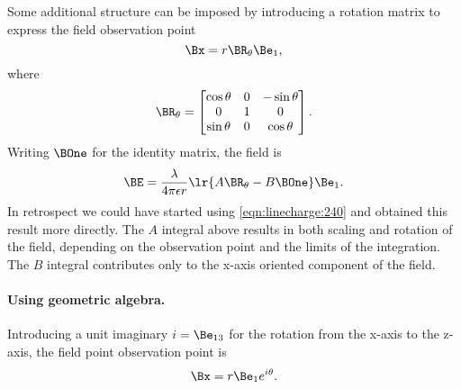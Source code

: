 Some additional structure can be imposed by introducing a rotation matrix to express the field observation point
\begin{equation}\label{eqn:linecharge:240}
\Bx = r \BR_\theta \Be_1,
\end{equation}
where
\begin{equation}\label{eqn:linecharge:260}
\BR_\theta =
\begin{bmatrix}
\cos\theta & 0 & -\sin\theta \\
0 & 1 & 0 \\
\sin\theta & 0 & \cos\theta \\
\end{bmatrix}.
\end{equation}
Writing \( \BOne \) for the  identity matrix, the field is
\begin{equation}\label{eqn:linecharge:280}
\BE = \frac{\lambda}{4 \pi \epsilon r} \lr{ A \BR_\theta - B \BOne } \Be_1.
\end{equation}
In retrospect we could have started using \cref{eqn:linecharge:240} and obtained this result more directly.
The \( A \) integral above results in both scaling and rotation of the field, depending on the observation point and the limits of the integration.  The \( B \) integral contributes only to the x-axis oriented component of the field.

\paragraph{Using geometric algebra.}

Introducing a unit imaginary \( i = \Be_{13} \) for the rotation from the x-axis to the z-axis, the field point observation point is
\begin{equation}\label{eqn:linecharge:120}
\Bx = r \Be_1 e^{i \theta}.
\end{equation}

